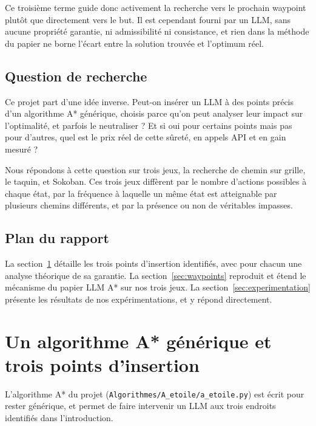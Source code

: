 \documentclass[11pt,a4paper]{article}
\begin{document}
\smallskip
\noindent
Ce troisième terme guide donc activement la recherche vers le prochain waypoint plutôt que directement vers le but. Il est cependant fourni par un LLM, sans aucune propriété garantie, ni admissibilité ni consistance, et rien dans la méthode du papier ne borne l'écart entre la solution trouvée et l'optimum réel.

\subsection{Question de recherche}

Ce projet part d'une idée inverse. Peut-on insérer un LLM à des points précis d'un algorithme A* générique, choisis parce qu'on peut analyser leur impact sur l'optimalité, et parfois le neutraliser ? Et si oui pour certains points mais pas pour d'autres, quel est le prix réel de cette sûreté, en appels API et en gain mesuré ?

Nous répondons à cette question sur trois jeux, la recherche de chemin sur grille, le taquin, et Sokoban. Ces trois jeux diffèrent par le nombre d'actions possibles à chaque état, par la fréquence à laquelle un même état est atteignable par plusieurs chemins différents, et par la présence ou non de véritables impasses.

\subsection{Plan du rapport}

La section~\ref{sec:points} détaille les trois points d'insertion identifiés, avec pour chacun une analyse théorique de sa garantie. La section~\ref{sec:waypoints} reproduit et étend le mécanisme du papier LLM A* sur nos trois jeux. La section~\ref{sec:experimentation} présente les résultats de nos expérimentations, et y répond directement.

\section{Un algorithme A* générique et trois points d'insertion}
\label{sec:points}

L'algorithme A* du projet (\texttt{Algorithmes/A\_etoile/a\_etoile.py}) est écrit pour rester générique, et permet de faire intervenir un LLM aux trois endroits identifiés dans l'introduction.
\end{document}
